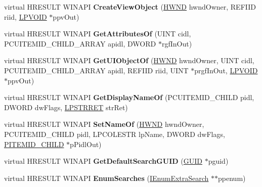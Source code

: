 \begin{DoxyCompactItemize}
virtual H\+R\+E\+S\+U\+LT W\+I\+N\+A\+PI {\bfseries Create\+View\+Object} (\hyperlink{interfacevoid}{H\+W\+ND} hwnd\+Owner, R\+E\+F\+I\+ID riid, \hyperlink{interfacevoid}{L\+P\+V\+O\+ID} $\ast$ppv\+Out)
\item 
\mbox{\label{class_c_admin_tools_folder_a9095235185ef1da55f99e82d3d1c6d19}} 
virtual H\+R\+E\+S\+U\+LT W\+I\+N\+A\+PI {\bfseries Get\+Attributes\+Of} (U\+I\+NT cidl, P\+C\+U\+I\+T\+E\+M\+I\+D\+\_\+\+C\+H\+I\+L\+D\+\_\+\+A\+R\+R\+AY apidl, D\+W\+O\+RD $\ast$rgf\+In\+Out)
\item 
\mbox{\label{class_c_admin_tools_folder_a2777af2eb1f6b4ad6bf85df88f70c22e}} 
virtual H\+R\+E\+S\+U\+LT W\+I\+N\+A\+PI {\bfseries Get\+U\+I\+Object\+Of} (\hyperlink{interfacevoid}{H\+W\+ND} hwnd\+Owner, U\+I\+NT cidl, P\+C\+U\+I\+T\+E\+M\+I\+D\+\_\+\+C\+H\+I\+L\+D\+\_\+\+A\+R\+R\+AY apidl, R\+E\+F\+I\+ID riid, U\+I\+NT $\ast$prgf\+In\+Out, \hyperlink{interfacevoid}{L\+P\+V\+O\+ID} $\ast$ppv\+Out)
\item 
\mbox{\label{class_c_admin_tools_folder_a714d818ea345760315c62af4ccb6bf3b}} 
virtual H\+R\+E\+S\+U\+LT W\+I\+N\+A\+PI {\bfseries Get\+Display\+Name\+Of} (P\+C\+U\+I\+T\+E\+M\+I\+D\+\_\+\+C\+H\+I\+LD pidl, D\+W\+O\+RD dw\+Flags, \hyperlink{struct___s_t_r_r_e_t}{L\+P\+S\+T\+R\+R\+ET} str\+Ret)
\item 
\mbox{\label{class_c_admin_tools_folder_a23c2778b4db2ad41266e67a3a51da29b}} 
virtual H\+R\+E\+S\+U\+LT W\+I\+N\+A\+PI {\bfseries Set\+Name\+Of} (\hyperlink{interfacevoid}{H\+W\+ND} hwnd\+Owner, P\+C\+U\+I\+T\+E\+M\+I\+D\+\_\+\+C\+H\+I\+LD pidl, L\+P\+C\+O\+L\+E\+S\+TR lp\+Name, D\+W\+O\+RD dw\+Flags, \hyperlink{struct___i_t_e_m_i_d___c_h_i_l_d}{P\+I\+T\+E\+M\+I\+D\+\_\+\+C\+H\+I\+LD} $\ast$p\+Pidl\+Out)
\item 
\mbox{\label{class_c_admin_tools_folder_ad0990158731e15326e9f548dc1fd475b}} 
virtual H\+R\+E\+S\+U\+LT W\+I\+N\+A\+PI {\bfseries Get\+Default\+Search\+G\+U\+ID} (\hyperlink{interface_g_u_i_d}{G\+U\+ID} $\ast$pguid)
\item 
\mbox{\label{class_c_admin_tools_folder_a25279056004ee2371f3227a3299f08c1}} 
virtual H\+R\+E\+S\+U\+LT W\+I\+N\+A\+PI {\bfseries Enum\+Searches} (\hyperlink{interface_i_enum_extra_search}{I\+Enum\+Extra\+Search} $\ast$$\ast$ppenum)
$$
\end{DoxyCompactItemize}

